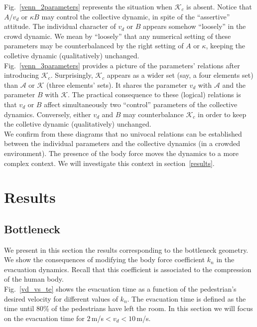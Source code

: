 \documentclass[preprint,12pt]{elsarticle}
\begin{document}
Fig.~\ref{venn_2parameters} represents the situation when $\mathcal{K}_c$ is 
absent. Notice that $A/v_d$ or $\kappa B$ may control the collective 
dynamic, in spite of the ``assertive'' attitude. The individual character of 
$v_d$ or $B$ appears somehow ``loosely'' in the crowd dynamic. We mean by 
``loosely'' that any numerical setting of these parameters may be 
counterbalanced by the right setting of $A$ or $\kappa$, keeping the 
colletive dynamic (qualitatively) unchanged.  \\

Fig.~\ref{venn_3parameters} provides a picture of the parameters' relations 
after introducing $\mathcal{K}_c$. Surprisingly, $\mathcal{K}_c$ appears as a
wider set (say, a four elements set) than $\mathcal{A}$ or $\mathcal{K}$ (three 
elements' sets). It shares the parameter $v_d$ with $\mathcal{A}$ and the 
parameter $B$ with $\mathcal{K}$. The practical consequence to these (logical)
relations is that $v_d$ or $B$ affect simultaneously two ``control'' parameters 
of the collective dynamics. Conversely, either $v_d$ and $B$ may counterbalance 
$\mathcal{K}_c$ in order to keep the colletive dynamic (qualitatively) 
unchanged.  \\

We confirm from these diagrams that no univocal relations can be established 
between the individual parameters and the collective dynamics (in a crowded 
environment). The presence of the body force moves the dynamics to a more 
complex context. We will investigate this context in section~\ref{results}. \\


\section{\label{results}Results}


\subsection{\label{bottleneck} Bottleneck}


We present in this section the results corresponding to the bottleneck geometry. 
We show the consequences of modifying the body force coefficient $k_n$ in the 
evacuation dynamics. Recall that this coefficient is associated 
to the compression of the human body. \\

Fig.~\ref{vd_vs_te} shows the evacuation time as a function of the pedestrian's 
desired velocity for different values of $k_n$. The evacuation 
time is defined as the time until 80\% of the pedestrians have 
left the room. In this section we will focus on the evacuation time for 
$2\,$m/s$<v_d<10\,$m/s.\\
\end{document}
